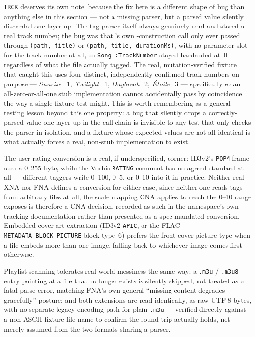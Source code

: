 \texttt{TRCK} deserves its own note, because the fix here is a different shape of bug than
anything else in this section --- not a missing parser, but a parsed value silently discarded
one layer up. The tag parser itself always genuinely read and stored a real track number; the
bug was that 's own -construction call only ever passed
through \texttt{(path, title)} or \texttt{(path, title, durationMs)}, with no parameter slot
for the track number at all, so \texttt{Song::TrackNumber} stayed hardcoded at~0 regardless of
what the file actually tagged. The real, mutation-verified fixture that caught this uses four
distinct, independently-confirmed track numbers on purpose --- \emph{Sunrise}=1,
\emph{Twilight}=1, \emph{Daybreak}=2, \emph{{\'E}toile}=3 --- specifically so an
all-zero-or-all-one stub implementation cannot accidentally pass by coincidence the way a
single-fixture test might. This is worth remembering as a general testing lesson beyond this
one property: a bug that silently drops a correctly-parsed value one layer up in the call chain
is invisible to any test that only checks the parser in isolation, and a fixture whose expected
values are not all identical is what actually forces a real, non-stub implementation to exist.

The user-rating conversion is a real, if underspecified, corner: ID3v2's \texttt{POPM} frame
uses a 0--255 byte, while the Vorbis \texttt{RATING} comment has no agreed standard at all ---
different taggers write 0--100, 0--5, or 0--10 into it in practice. Neither real XNA nor FNA
defines a conversion for either case, since neither one reads tags from arbitrary files at all;
the scale mapping CNA applies to reach the 0--10 range  exposes is
therefore a CNA decision, recorded as such in the namespace's own tracking documentation rather
than presented as a spec-mandated conversion. Embedded cover-art extraction (ID3v2
\texttt{APIC}, or the FLAC \texttt{METADATA\_BLOCK\_PICTURE} block type~6) prefers the
front-cover picture type when a file embeds more than one image, falling back to whichever
image comes first otherwise.

Playlist scanning tolerates real-world messiness the same way: a \texttt{.m3u} / \texttt{.m3u8}
entry pointing at a file that no longer exists is silently skipped, not treated as a fatal
parse error, matching FNA's own general ``missing content degrades gracefully'' posture; and
both extensions are read identically, as raw UTF-8 bytes, with no separate legacy-encoding path
for plain \texttt{.m3u} --- verified directly against a non-ASCII fixture file name to confirm
the round-trip actually holds, not merely assumed from the two formats sharing a parser.

